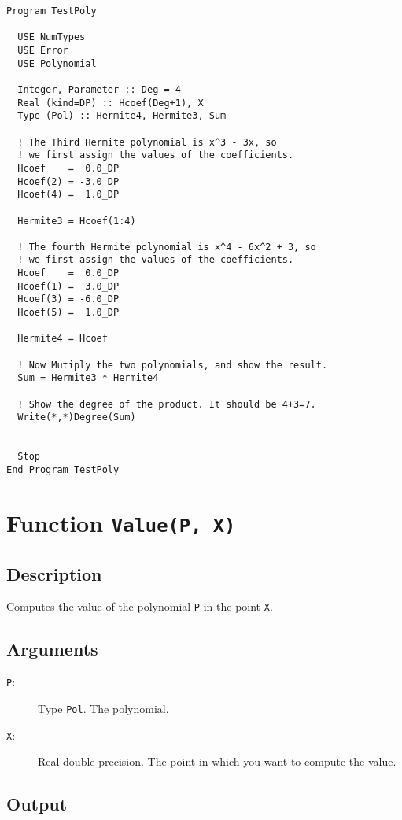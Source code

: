 \begin{verbatim}
Program TestPoly

  USE NumTypes
  USE Error
  USE Polynomial

  Integer, Parameter :: Deg = 4
  Real (kind=DP) :: Hcoef(Deg+1), X
  Type (Pol) :: Hermite4, Hermite3, Sum

  ! The Third Hermite polynomial is x^3 - 3x, so
  ! we first assign the values of the coefficients.
  Hcoef    =  0.0_DP
  Hcoef(2) = -3.0_DP
  Hcoef(4) =  1.0_DP

  Hermite3 = Hcoef(1:4)

  ! The fourth Hermite polynomial is x^4 - 6x^2 + 3, so
  ! we first assign the values of the coefficients.
  Hcoef    =  0.0_DP
  Hcoef(1) =  3.0_DP
  Hcoef(3) = -6.0_DP
  Hcoef(5) =  1.0_DP

  Hermite4 = Hcoef

  ! Now Mutiply the two polynomials, and show the result.
  Sum = Hermite3 * Hermite4

  ! Show the degree of the product. It should be 4+3=7.
  Write(*,*)Degree(Sum)


  Stop
End Program TestPoly
\end{verbatim}


\section{Function \texttt{Value(P, X)}}

\subsection{Description}

Computes the value of the polynomial \texttt{P} in the point \texttt{X}.

\subsection{Arguments}

\begin{description}
\item[\texttt{P}:] Type \texttt{Pol}. The polynomial.
\item[\texttt{X}:] Real double precision. The point in which you want
  to compute the value.
\end{description}

\subsection{Output}

